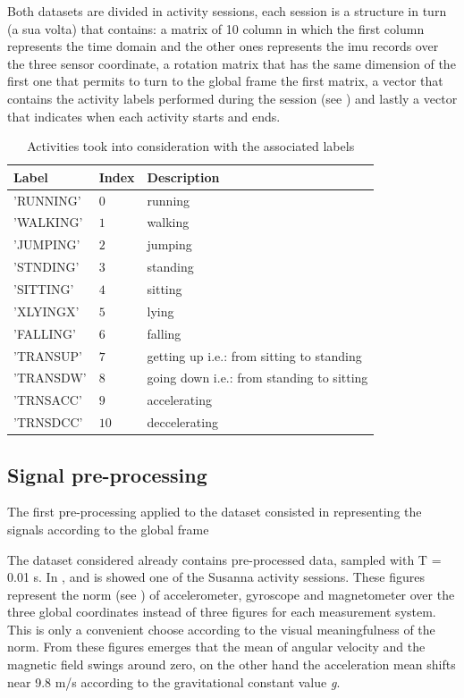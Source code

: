 Both datasets are divided in activity sessions, each session is a structure in turn (a sua volta) that contains: a matrix of 10 column in which the first column represents the time domain and the other ones represents the \gls{imu} records over the three sensor coordinate, a rotation matrix that has the same dimension of the first one that permits to turn to the global frame the first matrix, a vector that contains the activity labels performed during the session (see ) and lastly a vector that indicates when each activity starts and ends.

\begin{table}[htp]
\small
	\centering
		\renewcommand{\arraystretch}{1}%
	\begin{tabular}{@{}lll@{}}
	\toprule
	Label & Index & Description\\ \midrule
	'RUNNING' & $0$ & running \\
	'WALKING' & $1$ & walking \\
	'JUMPING' & $2$ & jumping  \\
	'STNDING' & $3$ & standing \\ 
	'SITTING' & $4$ & sitting\\
	'XLYINGX' & $5$ & lying \\
	'FALLING' & $6$ & falling \\
	'TRANSUP' & $7$ & getting up i.e.: from sitting to standing \\
	'TRANSDW' & $8$ & going down i.e.: from standing to sitting\\
	'TRNSACC' & $9$ & accelerating\\
	'TRNSDCC' & $10$ & deccelerating\\
	\bottomrule
	\end{tabular}
	\caption{Activities took into consideration with the associated labels}
	\label{tab:label}
\end{table}


\subsection{Signal pre-processing}
The first pre-processing applied to the dataset consisted in representing the signals according to the global frame


The dataset considered already contains pre-processed data, sampled with T = 0.01 s. In ,  and  is showed one of the Susanna activity sessions. These figures represent the norm (see ) of accelerometer, gyroscope and magnetometer over the three global coordinates instead of three figures for each measurement system. This is only a convenient choose according to the visual meaningfulness of the norm. 
From these figures emerges that the mean of angular velocity and the magnetic field swings around zero, on the other hand the acceleration mean shifts near 9.8 m/s according to the gravitational constant value \textit{g}.

